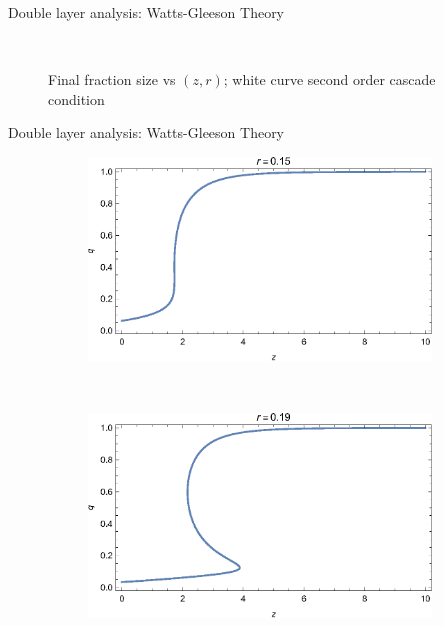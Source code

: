 \documentclass[10pt, xcolor=dvipsnames]{beamer}
\begin{document}
\begin{frame}{Double layer analysis: Watts-Gleeson Theory}
\begin{figure}
\begin{subfigure}[b]{0.4\textwidth}
    \end{subfigure}
    ~ %
    \caption{Final fraction size vs $(z,r)$; white curve second order cascade condition}
\end{figure}

\end{frame}

\begin{frame}{Double layer analysis: Watts-Gleeson Theory}
\begin{figure}
    \centering
    \begin{subfigure}[b]{0.4\textwidth}
        \includegraphics[width=\textwidth]{figures/two_layer_edge_qz_r015}
    \end{subfigure}
    ~ %
    \begin{subfigure}[b]{0.4\textwidth}
        \includegraphics[width=\textwidth]{figures/two_layer_edge_qz_r019}

\end{subfigure}
\end{figure}
\end{frame}
\end{document}
